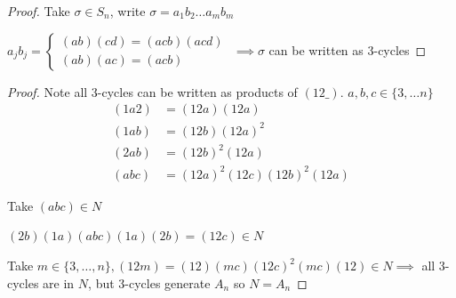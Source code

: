 \begin{proof}
    Take $\sigma \in S_n$, write $\sigma=a_1b_2\dots a_mb_m$

    $a_jb_j=\begin{cases} 
        (ab)(cd)=(acb)(acd)\\
        (ab)(ac)=(acb) 
     \end{cases}$
    $\implies \sigma$ can be written as 3-cycles
\end{proof}

\begin{proof}
    Note all 3-cycles can be written as products of $(12\_)$. 
    $a,b,c\in \{3,\dots n\}$
    \begin{align*}
        (1a2)&=(12a)(12a)\\
        (1ab)&=(12b)(12a)^2\\
        (2ab)&=(12b)^2(12a)\\
        (abc)&=(12a)^2(12c)(12b)^2(12a)
    \end{align*}

    Take $(abc)\in N$

    $(2b)(1a)(abc)(1a)(2b)=(12c) \in N$

    Take $m \in \{3,\dots,n\}, (12m)=(12)(mc)(12c)^2(mc)(12)\in N \implies$
    all 3-cycles are in $N$, but 3-cycles generate $A_n$ so $N=A_n$
\end{proof}
\newpage
{}

